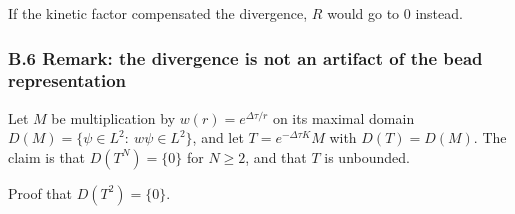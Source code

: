 \documentclass[11pt,a4paper]{article}
\newcommand{\tagmark}[1]{\marginnote{\scriptsize\ttfamily #1}}
\begin{document}
If the kinetic factor compensated the divergence, \(R\) would go to 0 instead.

\hypertarget{b.6-remark-the-divergence-is-not-an-artifact-of-the-bead-representation}{%
\subsubsection{B.6 Remark: the divergence is not an artifact of the bead representation}\label{b.6-remark-the-divergence-is-not-an-artifact-of-the-bead-representation}}

\tagmark{[D]} Let \(M\) be multiplication by \(w(r)=e^{\Delta\tau/r}\) on its maximal domain \(D(M)=\{\psi\in L^2:\ w\psi\in L^2\}\), and let \(T=e^{-\Delta\tau K}M\) with \(D(T)=D(M)\). The claim is that \(D(T^N)=\{0\}\) for \(N\ge2\), and that \(T\) is unbounded.

Proof that \(D(T^2)=\{0\}\).
\end{document}

